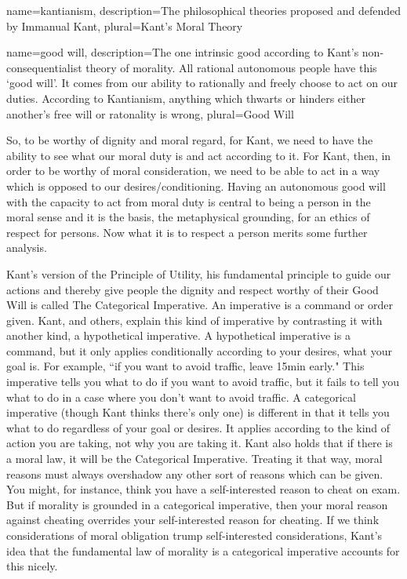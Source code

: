 {
  name=kantianism,
  description={The philosophical theories proposed and defended by Immanual Kant},
  plural=Kant's Moral Theory
}

{
  name=good will,
  description={The one intrinsic good according to Kant's non-consequentialist theory of morality. All rational autonomous people have this `good will'. It comes from our ability to rationally and freely choose to act on our duties. According to Kantianism, anything which thwarts or hinders either another's free will or ratonality is wrong},
  plural=Good Will
}


So, to be worthy of dignity and moral regard, for Kant, we need to have the ability to see what our moral duty is and act according to it. For Kant, then, in order to be worthy of moral consideration, we need to be able to act in a way which is opposed to our desires/conditioning. Having an autonomous good will with the capacity to act from moral duty is central to being a person in the moral sense and it is the basis, the metaphysical grounding, for an ethics of respect for persons. Now what it is to respect a person merits some further analysis.

Kant's version of the Principle of Utility, his fundamental principle to guide our actions and thereby give people the dignity and respect worthy of their Good Will is called The Categorical Imperative. An imperative is a command or order given. Kant, and others, explain this kind of imperative by contrasting it with another kind, a hypothetical imperative. A hypothetical imperative is a command, but it only applies conditionally according to your desires, what your goal is. For example, ``if you want to avoid traffic, leave 15min early." This imperative tells you what to do if you want to avoid traffic, but it fails to tell you what to do in a case where you don't want to avoid traffic. A categorical imperative (though Kant thinks there's only one) is different in that it tells you what to do regardless of your goal or desires. It applies according to the kind of action you are taking, not why you are taking it. Kant also holds that if there is a moral law, it will be the Categorical Imperative. Treating it that way, moral reasons must always overshadow any other sort of reasons which can be given. You might, for instance, think you have a self-interested reason to cheat on exam. But if morality is grounded in a categorical imperative, then your moral reason against cheating overrides your self-interested reason for cheating. If we think considerations of moral obligation trump self-interested considerations, Kant’s idea that the fundamental law of morality is a categorical imperative accounts for this nicely.


